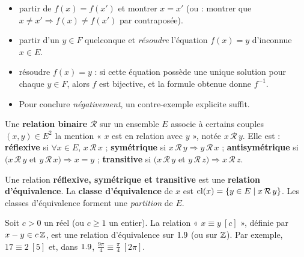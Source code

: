 \begin{savoirfaire}
\begin{itemize}[label={\color{otGreenDark}\textbullet},leftmargin=1.4em,itemsep=0.6mm,topsep=0.5mm]
  \item {} partir de $f(x)=f(x')$ et montrer $x=x'$
    (ou : montrer que $x\neq x'\Rightarrow f(x)\neq f(x')$ par contraposée).
  \item {} partir d'un $y\in F$ quelconque et \emph{résoudre}
    l'équation $f(x)=y$ d'inconnue $x\in E$.
  \item {} résoudre $f(x)=y$ : si cette équation possède une
    unique solution pour chaque $y\in F$, alors $f$ est bijective, et la
    formule obtenue donne $f^{-1}$.
  \item Pour conclure \emph{négativement}, un contre-exemple explicite suffit.
\end{itemize}
\end{savoirfaire}


\begin{definition}
Une \textbf{relation binaire} $\mathcal{R}$ sur un ensemble $E$ associe à
certains couples $(x,y)\in E^{2}$ la mention « $x$ est en relation avec $y$ »,
notée $x\,\mathcal{R}\,y$. Elle est :
\textbf{réflexive} si $\forall x\in E$, $x\,\mathcal{R}\,x$ ;
\textbf{symétrique} si $x\,\mathcal{R}\,y\Rightarrow y\,\mathcal{R}\,x$ ;
\textbf{antisymétrique} si $\bigl(x\,\mathcal{R}\,y$ et $y\,\mathcal{R}\,x\bigr)\Rightarrow x=y$ ;
\textbf{transitive} si $\bigl(x\,\mathcal{R}\,y$ et $y\,\mathcal{R}\,z\bigr)\Rightarrow x\,\mathcal{R}\,z$.
\end{definition}

\begin{definition}
Une relation \textbf{réflexive, symétrique et transitive} est une
\textbf{relation d'équivalence}. La \textbf{classe d'équivalence} de $x$ est
$\mathrm{cl}(x)=\left\{y\in E \mid x\,\mathcal{R}\,y\right\}$.
Les classes d'équivalence forment une \emph{partition} de $E$.
\end{definition}

\begin{exemple}[Congruences]
Soit $c>0$ un réel (ou $c\geq1$ un entier). La relation « $x\equiv y\ [c]$ »,
définie par $x-y\in c\,\mathbb{Z}$, est une relation d'équivalence sur $1.9$ (ou sur
$\mathbb{Z}$). Par exemple, $17\equiv 2\ [5]$ et, dans $1.9$,
$\frac{9\pi}{4}\equiv\frac{\pi}{4}\ [2\pi]$.
\end{exemple}

